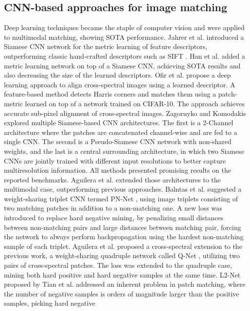 \documentclass[10pt,journal]{IEEEtran}\usepackage{amsfonts}
\begin{document}
\subsection{CNN-based approaches for image matching}

Deep learning techniques became the staple of computer vision and were
applied to multimodal matching, showing SOTA performance. Jahrer et al.\cite {siamesenn} introduced a Siamese CNN network for the metric learning of
feature descriptors, outperforming classic hand-crafted descriptors such as
SIFT \cite{SIFT}. Han et al.\cite{MatchNet} added a metric learning network
on top of a Siamese CNN, achieving SOTA results and also decreasing the size
of the learned descriptors. Ofir et al. \cite{8451640} propose a deep
learning approach to align cross-spectral images using a learned descriptor.
A feature-based method detects Harris corners and matches them using a
patch-metric learned on top of a network trained on CIFAR-10. The approach
achieves accurate sub-pixel alignment of cross-spectral images. Zagoruyko
and Komodakis \cite{Zagoruyko} explored multiple Siamese-based CNN
architectures. The first is a 2-Channel architecture where the patches are
concatenated channel-wise and are fed to a single CNN. The second is a
Pseudo-Siamese CNN network with non-shared weights, and the last is a
central surrounding architecture, in which two Siamese CNNs are jointly
trained with different input resolutions to better capture multiresolution
information. All methods presented promising results on the reported
benchmarks. Aguilera et al.\cite{SiameseCrossSpectral} extended those
architectures to the multimodal case, outperforming previous approaches.
Balntas et al. suggested a weight-sharing triplet CNN termed PN-Net \cite {PN_net}, using image triplets consisting of two matching patches in
addition to a non-matching one. A new loss was introduced to replace hard
negative mining, by penalizing small  distances between non-matching
pairs and large  distances between matching pair, forcing the network
to always perform backpropagation using the hardest non-matching sample of
each triplet. Aguilera et al. proposed a cross-spectral extension to the
previous work, a weight-sharing quadruple network called Q-Net \cite{Q-net},
utilizing two pairs of cross-spectral patches. The loss was extended to the
quadruple case, mining both hard positive and hard negative samples at the
same time. L2-Net \cite{L2Net} proposed by Tian et al. addressed an inherent
problem in patch matching, where the number of negative samples is orders of
magnitude larger than the positive samples, picking  hard negative
\end{document}
